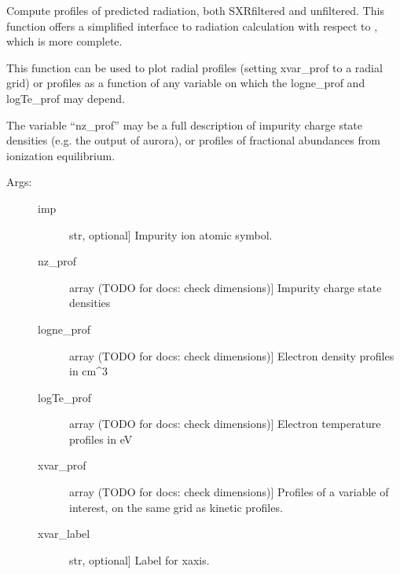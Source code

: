 \documentclass[letterpaper,10pt,english]{sphinxmanual}
\begin{document}
\begin{fulllineitems}
\label{\detokenize{aurora:aurora.radiation.plot_radiation_profs}}
Compute profiles of predicted radiation, both SXR\sphinxhyphen{}filtered and unfiltered.
This function offers a simplified interface to radiation calculation with respect to 
{\hyperref[\detokenize{aurora:aurora.radiation.compute_rad}]{}}, which is more complete.

This function can be used to plot radial profiles (setting xvar\_prof to a radial grid)
or profiles as a function of any variable on which the logne\_prof and logTe\_prof
may depend.

The variable “nz\_prof” may be a full description of impurity charge state densities
(e.g. the output of aurora), or profiles of fractional abundances from ionization equilibrium.
\begin{description}
\item[{Args: }] \leavevmode\begin{description}
\item[{imp}] \leavevmode{[}str, optional{]}
Impurity ion atomic symbol.

\item[{nz\_prof}] \leavevmode{[}array (TODO for docs: check dimensions){]}
Impurity charge state densities

\item[{logne\_prof}] \leavevmode{[}array (TODO for docs: check dimensions){]}
Electron density profiles in cm\textasciicircum{}\sphinxhyphen{}3

\item[{logTe\_prof}] \leavevmode{[}array (TODO for docs: check dimensions){]}
Electron temperature profiles in eV

\item[{xvar\_prof}] \leavevmode{[}array (TODO for docs: check dimensions){]}
Profiles of a variable of interest, on the same grid as kinetic profiles.

\item[{xvar\_label}] \leavevmode{[}str, optional{]}
Label for x\sphinxhyphen{}axis.


\end{description}
\end{description}
\end{fulllineitems}
\end{document}
